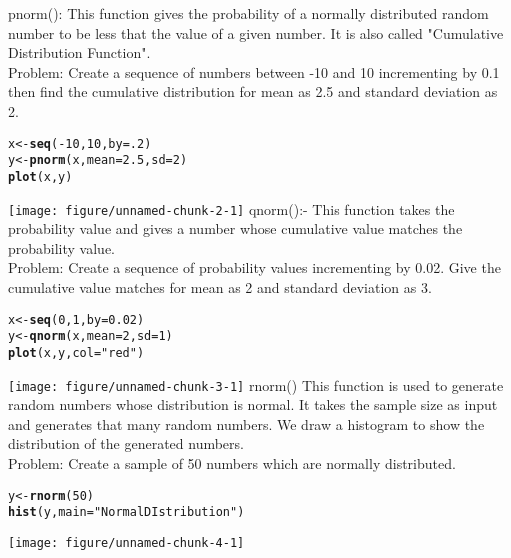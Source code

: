 \documentclass{article}\usepackage[]{graphicx}\usepackage[]{xcolor}
\makeatletter
\def\maxwidth{ %
  \ifdim\Gin@nat@width>\linewidth
    \linewidth
  \else
    \Gin@nat@width
  \fi
}
\newcommand{\hlnum}[1]{\textcolor[rgb]{0.686,0.059,0.569}{#1}}%
\newcommand{\hlsng}[1]{\textcolor[rgb]{0.192,0.494,0.8}{#1}}%
\newcommand{\hlopt}[1]{\textcolor[rgb]{0,0,0}{#1}}%
\newcommand{\hldef}[1]{\textcolor[rgb]{0.345,0.345,0.345}{#1}}%
\newcommand{\hlkwb}[1]{\textcolor[rgb]{0.69,0.353,0.396}{#1}}%
\newcommand{\hlkwc}[1]{\textcolor[rgb]{0.333,0.667,0.333}{#1}}%
\newcommand{\hlkwd}[1]{\textcolor[rgb]{0.737,0.353,0.396}{\textbf{#1}}}%
\newenvironment{kframe}{%
 \def\at@end@of@kframe{}%
 \ifinner\ifhmode%
  \def\at@end@of@kframe{\end{minipage}}%
  \begin{minipage}{\columnwidth}%
 \fi\fi%
 \def\FrameCommand##1{\hskip\@totalleftmargin \hskip-\fboxsep
 \colorbox{shadecolor}{##1}\hskip-\fboxsep
     \hskip-\linewidth \hskip-\@totalleftmargin \hskip\columnwidth}%
 \MakeFramed {\advance\hsize-\width
   \@totalleftmargin\z@ \linewidth\hsize
   \@setminipage}}%
 {\par\unskip\endMakeFramed%
 \at@end@of@kframe}
\newenvironment{knitrout}{}{} %
\makeatother
\begin{document}
pnorm():
This function gives the probability of a normally distributed random number to be less that the value of a given number. It is also called "Cumulative Distribution Function".\\
Problem: \newline
Create a sequence of numbers between -10 and 10 incrementing by 0.1 then find the cumulative distribution  for mean as 2.5 and standard deviation as 2.
\begin{knitrout}
\color{fgcolor}\begin{kframe}
\begin{alltt}
\hldef{x} \hlkwb{<-} \hlkwd{seq}\hldef{(}\hlopt{-}\hlnum{10}\hldef{,}\hlnum{10}\hldef{,}\hlkwc{by}\hldef{=}\hlnum{.2}\hldef{)}
\hldef{y} \hlkwb{<-} \hlkwd{pnorm}\hldef{(x,}\hlkwc{mean}\hldef{=}\hlnum{2.5}\hldef{,}\hlkwc{sd} \hldef{=} \hlnum{2}\hldef{)}
\hlkwd{plot}\hldef{(x,y)}
\end{alltt}
\end{kframe}
\texttt{[image: figure/unnamed-chunk-2-1]} 
\end{knitrout}
qnorm():-
This function takes the probability value and gives a number whose cumulative value matches the probability value.\\
Problem: \newline
Create a sequence of probability values incrementing by 0.02. Give the cumulative value matches for mean as 2 and standard deviation as 3.
\begin{knitrout}
\color{fgcolor}\begin{kframe}
\begin{alltt}
\hldef{x} \hlkwb{<-} \hlkwd{seq}\hldef{(}\hlnum{0}\hldef{,}\hlnum{1}\hldef{,}\hlkwc{by}\hldef{=}\hlnum{0.02}\hldef{)}
\hldef{y} \hlkwb{<-} \hlkwd{qnorm}\hldef{(x,}\hlkwc{mean}\hldef{=}\hlnum{2}\hldef{,}\hlkwc{sd}\hldef{=}\hlnum{1}\hldef{)}
\hlkwd{plot}\hldef{(x,y,} \hlkwc{col}\hldef{=}\hlsng{"red"}\hldef{)}
\end{alltt}
\end{kframe}
\texttt{[image: figure/unnamed-chunk-3-1]} 
\end{knitrout}
rnorm()
This function is used to generate random numbers whose distribution is normal. It takes the sample size as input and generates that many random numbers. We draw a histogram to show the distribution of the generated numbers.\\
Problem: \newline
Create a sample of 50 numbers which are normally distributed.
\begin{knitrout}
\color{fgcolor}\begin{kframe}
\begin{alltt}
\hldef{y} \hlkwb{<-} \hlkwd{rnorm}\hldef{(}\hlnum{50}\hldef{)}
\hlkwd{hist}\hldef{(y,} \hlkwc{main} \hldef{=} \hlsng{"Normal DIstribution"}\hldef{)}
\end{alltt}
\end{kframe}
\texttt{[image: figure/unnamed-chunk-4-1]} 
\end{knitrout}
\end{document}
